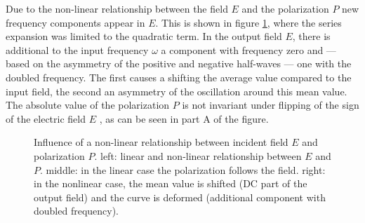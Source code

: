 Due to the non-linear relationship between the field $E$ and the
polarization $P$ new frequency components appear in $E$. This
is shown in  figure \ref{fig:shg_nonlinear_polarization},
where the series expansion was limited to the quadratic term. In the output field $E$, there is  additional to the 
input frequency $\omega$ a component with frequency zero and --- based on the asymmetry of the positive and negative half-waves ---
one with the doubled frequency. The first causes a
shifting the average value compared to the input field, the second
an asymmetry of the oscillation around this mean value. The absolute value of the polarization $P$ is not invariant under flipping of the  sign of the electric field $E$ , as can be seen in part A of the figure.


\begin{figure}
\center
\caption{Influence of a non-linear relationship between
incident field $E$ and polarization $P$. left: linear and non-linear relationship
between $E$ and $P$. middle: in the linear case the polarization follows
the field. right: in the nonlinear case, the mean value is
shifted (DC part of the output field) and the
curve is deformed (additional component with doubled frequency).}
\label{fig:shg_nonlinear_polarization}
\end{figure}



